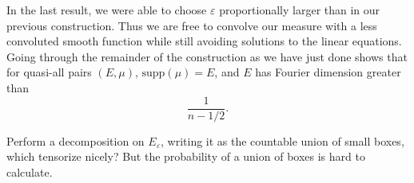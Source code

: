 In the last result, we were able to choose $\varepsilon$ proportionally larger than in our previous construction. Thus we are free to convolve our measure with a less convoluted smooth function while still avoiding solutions to the linear equations. Going through the remainder of the construction as we have just done shows that for quasi-all pairs $(E,\mu)$, $\text{supp}(\mu) = E$, and $E$ has Fourier dimension greater than
%
\[ \frac{1}{n - 1/2}. \]

Perform a decomposition on $E_\varepsilon$, writing it as the countable union of small boxes, which tensorize nicely? But the probability of a union of boxes is hard to calculate.


